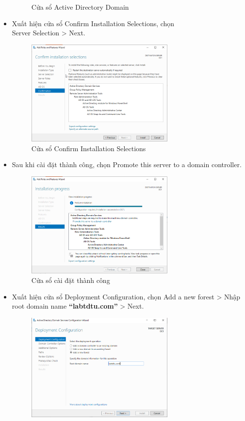 \documentclass[13pt]{report}
\begin{document}
\begin{itemize}
\begin{figure}[htp]
			\caption{Cửa sổ Active Directory Domain}
		\end{figure}
		\item Xuất hiện cửa sổ Confirm Installation Selections, chọn \\Server Selection > Next.
		\begin{figure}[htp]
			\centering
			\includegraphics[width=0.7\textwidth]{image/Gui/ADDC/9.png}
			\caption{Cửa sổ Confirm Installation Selections}
		\end{figure}
		\newpage\item Sau khi cài đặt thành công, chọn Promote this server to a domain controller.
		\begin{figure}[htp]
			\centering
			\includegraphics[width=0.7\textwidth]{image/Gui/ADDC/10.png}
			\caption{Cửa sổ cài đặt thành công}
		\end{figure}
		\item Xuất hiện cửa sổ Deployment Configuration, chọn Add a new forest > Nhập root domain name \textbf{“labtdtu.com”} > Next.
		\begin{figure}[htp]
			\centering
			\includegraphics[width=0.7\textwidth]{image/Gui/ADDC/11.png}

\end{figure}
\end{itemize}
\end{document}
